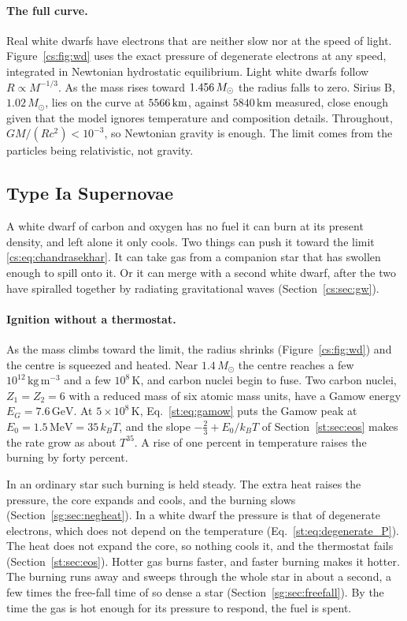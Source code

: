 \paragraph{The full curve.} Real white dwarfs have electrons that are neither slow nor at the speed of light. Figure~\ref{cs:fig:wd} uses the exact pressure of degenerate electrons at any speed, integrated in Newtonian hydrostatic equilibrium. Light white dwarfs follow $R\propto M^{-1/3}$. As the mass rises toward $1.456\,M_\odot$ the radius falls to zero. Sirius B, $1.02\,M_\odot$, lies on the curve at $5566\,\mathrm{km}$, against $5840\,\mathrm{km}$ measured, close enough given that the model ignores temperature and composition details. Throughout, $GM/(Rc^2)<10^{-3}$, so Newtonian gravity is enough. The limit comes from the particles being relativistic, not gravity.

\subsection{Type Ia Supernovae}
\label{cs:sec:snIa}

A white dwarf of carbon and oxygen has no fuel it can burn at its present density, and left alone it only cools. Two things can push it toward the limit \eqref{cs:eq:chandrasekhar}. It can take gas from a companion star that has swollen enough to spill onto it. Or it can merge with a second white dwarf, after the two have spiralled together by radiating gravitational waves (Section~\ref{cs:sec:gw}).

\paragraph{Ignition without a thermostat.} As the mass climbs toward the limit, the radius shrinks (Figure~\ref{cs:fig:wd}) and the centre is squeezed and heated. Near $1.4\,M_\odot$ the centre reaches a few $10^{12}\,\mathrm{kg\,m^{-3}}$ and a few $10^8\,\mathrm K$, and carbon nuclei begin to fuse. Two carbon nuclei, $Z_1=Z_2=6$ with a reduced mass of six atomic mass units, have a Gamow energy $E_G=7.6\,\mathrm{GeV}$. At $5\times10^8\,\mathrm K$, Eq.~\eqref{st:eq:gamow} puts the Gamow peak at $E_0=1.5\,\mathrm{MeV}=35\,k_BT$, and the slope $-\tfrac23+E_0/k_BT$ of Section~\ref{st:sec:eos} makes the rate grow as about $T^{35}$. A rise of one percent in temperature raises the burning by forty percent.

In an ordinary star such burning is held steady. The extra heat raises the pressure, the core expands and cools, and the burning slows (Section~\ref{sg:sec:negheat}). In a white dwarf the pressure is that of degenerate electrons, which does not depend on the temperature (Eq.~\eqref{st:eq:degenerate_P}). The heat does not expand the core, so nothing cools it, and the thermostat fails (Section~\ref{st:sec:eos}). Hotter gas burns faster, and faster burning makes it hotter. The burning runs away and sweeps through the whole star in about a second, a few times the free-fall time of so dense a star (Section~\ref{sg:sec:freefall}). By the time the gas is hot enough for its pressure to respond, the fuel is spent.

